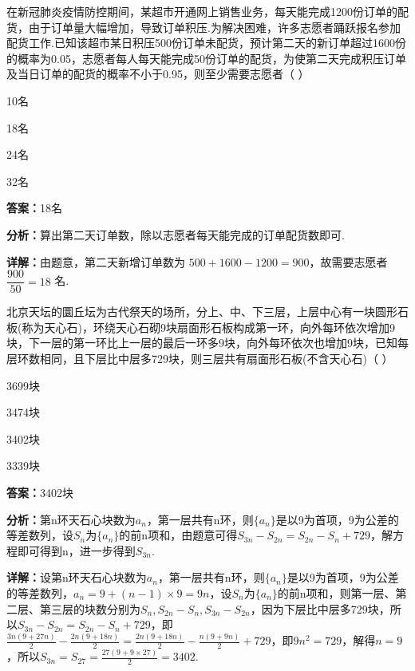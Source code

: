 \begin{question}[points=5]
在新冠肺炎疫情防控期间，某超市开通网上销售业务，每天能完成1200份订单的配货，由于订单量大幅增加，导致订单积压.为解决困难，许多志愿者踊跃报名参加配货工作.已知该超市某日积压500份订单未配货，预计第二天的新订单超过1600份的概率为0.05，志愿者每人每天能完成50份订单的配货，为使第二天完成积压订单及当日订单的配货的概率不小于0.95，则至少需要志愿者（ ）
\begin{choices}
  \item 10名
  \item 18名
  \item 24名
  \item 32名
\end{choices}
\begin{solution}
\textbf{答案：}18名

\textbf{分析：}算出第二天订单数，除以志愿者每天能完成的订单配货数即可.

\textbf{详解：}由题意，第二天新增订单数为 $500+1600-1200=900$，故需要志愿者 $\dfrac{900}{50}=18$ 名.
\end{solution}
\end{question}

\begin{question}[points=5]
北京天坛的圜丘坛为古代祭天的场所，分上、中、下三层，上层中心有一块圆形石板(称为天心石)，环绕天心石砌9块扇面形石板构成第一环，向外每环依次增加9块，下一层的第一环比上一层的最后一环多9块，向外每环依次也增加9块，已知每层环数相同，且下层比中层多729块，则三层共有扇面形石板(不含天心石)（ ）
\begin{choices}
  \item 3699块
  \item 3474块
  \item 3402块
  \item 3339块
\end{choices}
\begin{solution}
\textbf{答案：}3402块

\textbf{分析：}第n环天石心块数为$a_n$，第一层共有n环，则$\{a_n\}$是以9为首项，9为公差的等差数列，设$S_n$为$\{a_n\}$的前n项和，由题意可得$S_{3n}-S_{2n}=S_{2n}-S_n+729$，解方程即可得到n，进一步得到$S_{3n}$.

\textbf{详解：}设第n环天石心块数为$a_n$，第一层共有n环，则$\{a_n\}$是以9为首项，9为公差的等差数列，$a_n=9+(n-1)\times9=9n$，设$S_n$为$\{a_n\}$的前n项和，则第一层、第二层、第三层的块数分别为$S_n,S_{2n}-S_n,S_{3n}-S_{2n}$，因为下层比中层多729块，所以$S_{3n}-S_{2n}=S_{2n}-S_n+729$，即$\frac{3n(9+27n)}{2}-\frac{2n(9+18n)}{2}=\frac{2n(9+18n)}{2}-\frac{n(9+9n)}{2}+729$，即$9n^2=729$，解得$n=9$，所以$S_{3n}=S_{27}=\frac{27(9+9\times27)}{2}=3402$.
\end{solution}
\end{question}


